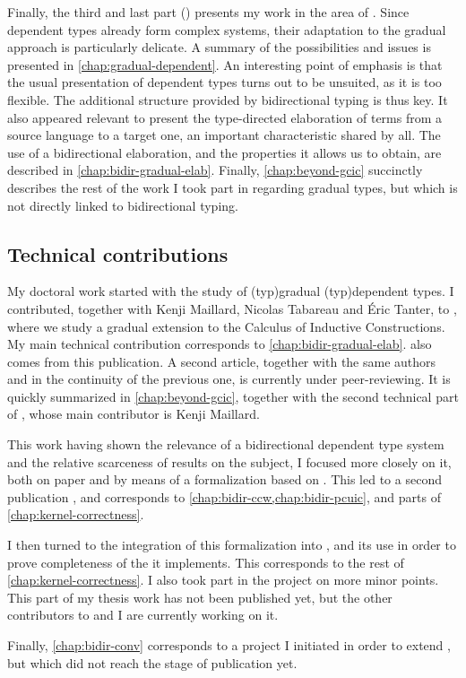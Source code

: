 Finally, the third and last part () presents my work in the area
of . Since dependent types already form complex systems, their adaptation
to the gradual approach is particularly delicate. A summary of the possibilities and issues is
presented in \cref{chap:gradual-dependent}. An interesting point of emphasis is that the
usual presentation of dependent types turns out to be unsuited, as it is too flexible.
The additional structure provided by bidirectional typing is thus key. It also
appeared relevant to present the type-directed elaboration of terms from a source language
to a target one, an important characteristic shared by all.
The use of a bidirectional elaboration, and the properties it allows us to obtain, are described
in \cref{chap:bidir-gradual-elab}. Finally, \cref{chap:beyond-gcic} succinctly describes the
rest of the work I took part in regarding gradual types, but which is not directly
linked to bidirectional typing.

\subsection{Technical contributions}

My doctoral work started with the study of \kl(typ){gradual}
\kl(typ){dependent} types.
I contributed, together with Kenji Maillard, Nicolas Tabareau and Éric Tanter, to
, where we study a gradual extension to the
Calculus of Inductive Constructions. My main technical contribution corresponds
to \cref{chap:bidir-gradual-elab}.  also comes from this
publication. A second article, together with the same authors and in the continuity of the
previous one, is currently under peer-reviewing. It is quickly summarized in
\cref{chap:beyond-gcic}, together with the second technical part of
\textcite{LennonBertrand2022}, whose main contributor is Kenji Maillard.

This work having shown the relevance of a bidirectional dependent type system and the relative
scarceness of results on the subject, I focused more closely on it, both on
paper and by means of a formalization based on . This led to a second publication
, and corresponds to \cref{chap:bidir-ccw,chap:bidir-pcuic},
and parts of \cref{chap:kernel-correctness}.

I then turned to the integration of this formalization into , and its use
in order to prove completeness of the  it implements. This corresponds to the
rest of \cref{chap:kernel-correctness}. I also took part in the project on more minor points.
This part of my thesis work has not been published yet, but the other contributors to
 and I are currently working on it.

Finally, \cref{chap:bidir-conv} corresponds to a project I initiated in order to extend
, but which did not reach the stage of publication yet.